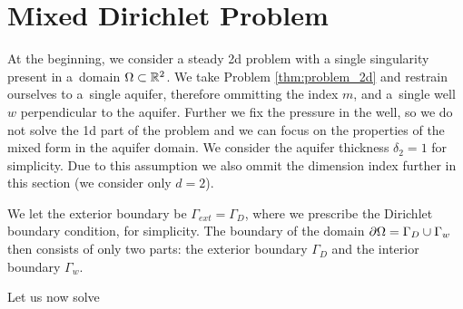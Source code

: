 \section{Mixed Dirichlet Problem}

At the beginning, we consider a steady 2d problem with a single singularity present in a~domain $\Omega\subset\mathbb{R}^2$.
We take Problem \ref{thm:problem_2d} and restrain ourselves to a~single aquifer, therefore ommitting the index $m$,
and a~single well $w$ perpendicular to the aquifer. Further we fix the pressure in the well,
so we do not solve the 1d part of the problem
and we can focus on the properties of the mixed form in the aquifer domain.
We consider the aquifer thickness $\delta_2=1$ for simplicity.
Due to this assumption we also ommit the dimension index further in this section (we consider only $d=2$).

We let the exterior boundary be  $\Gamma_{ext}=\Gamma_D$, where we prescribe the Dirichlet boundary condition, for simplicity.
The boundary of the domain $\partial\Omega=\Gamma_D \cup \Gamma_w$ then consists of only two parts: the exterior boundary $\Gamma_D$
and the interior boundary $\Gamma_w$.

Let us now solve

